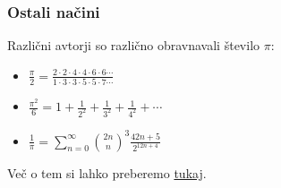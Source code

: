 \documentclass{beamer}
\begin{document}
\begin{frame}
    \frametitle{Ostali načini}
    Različni avtorji so različno obravnavali število $\pi$:
    \begin{itemize}
        \item $\displaystyle{\frac{\pi}{2} = \frac{2 \cdot 2 \cdot 4 \cdot 4 \cdot 6\cdot 6 \cdots}{1\cdot 3 \cdot 3 \cdot 5 \cdot 5 \cdot 7 \cdots}}$
        \item $\displaystyle{\frac{\pi^2}{6} = 1 + \frac{1}{2^2} + \frac{1}{3^2} + \frac{1}{4^2} + \cdots}$
        \item $\displaystyle{\frac{1}{\pi} = \sum_{n=0}^{\infty}{2n \choose n}^3 \frac{42n+5}{2^{12n+4}}}$      
    \end{itemize}

    Več o tem si lahko preberemo \href{http://www.nieuwarchief.nl/serie5/pdf/naw5-2000-01-3-254.pdf}{tukaj}.
\end{frame}
\end{document}
